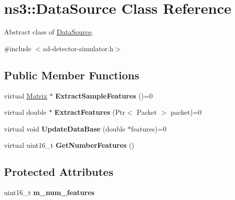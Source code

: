 \hypertarget{classns3_1_1DataSource}{}\section{ns3\+:\+:Data\+Source Class Reference}
\label{classns3_1_1DataSource}


Abstract class of \hyperlink{classns3_1_1DataSource}{Data\+Source}.  




{\ttfamily \#include $<$ad-\/detector-\/simulator.\+h$>$}

\subsection*{Public Member Functions}
\begin{DoxyCompactItemize}
\item 
\hypertarget{classns3_1_1DataSource_a52c62cbea37352a3dbd8ebb5cad21e2e}{}virtual \hyperlink{classns3_1_1Matrix}{Matrix} $\ast$ {\bfseries Extract\+Sample\+Features} ()=0\label{classns3_1_1DataSource_a52c62cbea37352a3dbd8ebb5cad21e2e}

\item 
\hypertarget{classns3_1_1DataSource_aa0a81da633e97fc2a27d833636c54d95}{}virtual double $\ast$ {\bfseries Extract\+Features} (Ptr$<$ Packet $>$ packet)=0\label{classns3_1_1DataSource_aa0a81da633e97fc2a27d833636c54d95}

\item 
\hypertarget{classns3_1_1DataSource_a1e2ec3c1ba6468aba51cab6303750d7e}{}virtual void {\bfseries Update\+Data\+Base} (double $\ast$features)=0\label{classns3_1_1DataSource_a1e2ec3c1ba6468aba51cab6303750d7e}

\item 
\hypertarget{classns3_1_1DataSource_a439fd33670b58b31d8a864e67531f35c}{}virtual uint16\+\_\+t {\bfseries Get\+Number\+Features} ()\label{classns3_1_1DataSource_a439fd33670b58b31d8a864e67531f35c}

\end{DoxyCompactItemize}
\subsection*{Protected Attributes}
\begin{DoxyCompactItemize}
\item 
\hypertarget{classns3_1_1DataSource_a26702605e6705e875ea737b0cf32fdc7}{}uint16\+\_\+t {\bfseries m\+\_\+num\+\_\+features}\label{classns3_1_1DataSource_a26702605e6705e875ea737b0cf32fdc7}

\end{DoxyCompactItemize}


